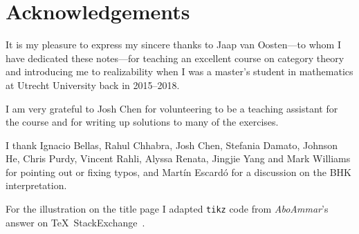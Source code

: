 \chapter{Acknowledgements}

It is my pleasure to express my sincere thanks to Jaap van Oosten---to whom I
have dedicated these notes---for teaching an excellent course on category
theory~\cite{vanOosten2016} and introducing me to realizability when I was a
master's student in mathematics at Utrecht University back in 2015--2018.

I am very grateful to Josh Chen for volunteering to be a teaching assistant
for the course and for writing up solutions to many of the exercises.

I thank Ignacio Bellas, Rahul Chhabra, Josh Chen, Stefania Damato, Johnson He,
Chris Purdy, Vincent Rahli, Alyssa Renata, Jingjie Yang and Mark Williams for
pointing out or fixing typos, and Mart\'in Escard\'o for a discussion on the BHK
interpretation.

For the illustration on the title page I adapted \verb|tikz| code from
\emph{AboAmmar}'s answer on \TeX\ StackExchange~\cite{latex-triangle}.


